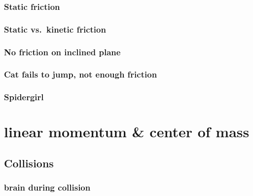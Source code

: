 \documentclass[
  letterpaper,
  DIV=11,
  numbers=noendperiod]{scrreprt}
\begin{document}

\subsection*{Static friction}\label{static-friction}

\subsection*{Static vs.~kinetic
friction}\label{static-vs.-kinetic-friction}

\subsection*{No friction on inclined
plane}\label{no-friction-on-inclined-plane}

\subsection*{Cat fails to jump, not enough
friction}\label{cat-fails-to-jump-not-enough-friction}

\subsection*{Spidergirl}\label{spidergirl}

\chapter*{linear momentum \& center of
mass}\label{linear-momentum-center-of-mass}


\section*{Collisions}\label{collisions}


\subsection*{brain during collision}\label{brain-during-collision}
\end{document}
